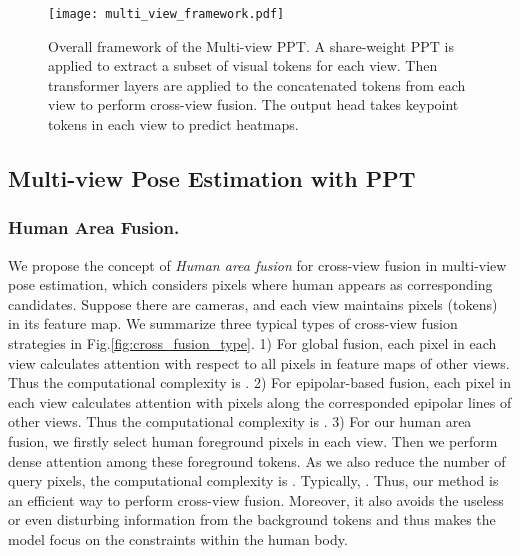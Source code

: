 \documentclass[runningheads]{llncs}
\begin{document}
\begin{figure}[t!]
    \centering
    \texttt{[image: multi\_view\_framework.pdf]}
    \caption{ \small{Overall framework of the Multi-view PPT. A share-weight PPT is applied to extract a subset of visual tokens for each view. Then  transformer layers are applied to the concatenated tokens from each view to perform cross-view fusion. The output head takes keypoint tokens in each view to predict heatmaps.} }
    \label{fig:multi_view_framework}
\end{figure}



\vspace{-0.5em}
\subsection{Multi-view Pose Estimation with PPT}
\label{sec:PPT_multiview}


\subsubsection{Human Area Fusion. }
We propose the concept of \textit{Human area fusion} for cross-view fusion in multi-view pose estimation, which considers pixels where human appears as corresponding candidates.
Suppose there are  cameras, and each view maintains  pixels (tokens) in its feature map. 
We summarize three typical types of cross-view fusion strategies in Fig.\ref{fig:cross_fusion_type}. 
1) For global fusion, each pixel in each view calculates attention with respect to all  pixels in feature maps of other  views. Thus the computational complexity is .
2) For epipolar-based fusion, each pixel in each view calculates attention with  pixels along the corresponded epipolar lines of other  views. Thus the computational complexity is . 
3) For our human area fusion, we firstly select  human foreground pixels in each view. Then we perform dense attention among these foreground tokens. As we also reduce the number of query pixels, the computational complexity is . Typically, . 
Thus, our method is an efficient way to perform cross-view fusion. Moreover, it also avoids the useless or even disturbing information from the background tokens and thus makes the model focus on the constraints within the human body. 
\end{document}
